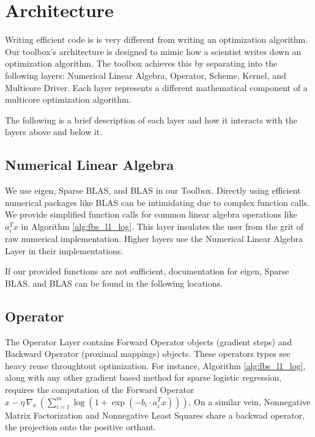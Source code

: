 \section{Architecture}


Writing efficient code is is very different from writing an optimization algorithm.
Our toolbox's architecture is designed to mimic how a scientist writes down an optimization algorithm.
The toolbox achieves this by separating into the following layers: Numerical Linear Algebra, Operator, Scheme, Kernel, and Multicore Driver.
Each layer represents a different mathematical component of a multicore optimization algorithm. 


The following is a brief description of each layer and how it interacts with the layers above and below it.

\subsection{Numerical Linear Algebra}

We use eigen, Sparse BLAS, and BLAS in our Toolbox.
Directly using efficient numerical packages like BLAS can be intimidating due to complex function calls. We provide simplified function calls for common linear algebra operations like $a_i^T x$ in Algorithm \ref{alg:fbs_l1_log}. This layer insulates the user from the grit of raw numerical implementation. Higher layers use the Numerical Linear Algebra Layer in their implementations.


If our provided functions are not sufficient, documentation for eigen, Sparse BLAS, and BLAS can be found in the following locations.

\subsection{Operator}

The Operator Layer contains Forward Operator objects (gradient steps) and Backward Operator (proximal mappings) objects. These operators types see heavy reuse throughtout optimization.
For instance, Algorithm \ref{alg:fbs_l1_log}, along with any other gradient based method for sparse logistic regression, requires the computation of the Forward Operator $x - \eta \, \nabla_x \,(\sum_{i = 1}^m \log (1 + \exp(-b_i \cdot a_i^T x)))$. On a similar vein, Nonnegative Matrix Factorization and Nonnegative Least Squares share a backwad operator, the projection onto the positive orthant.

